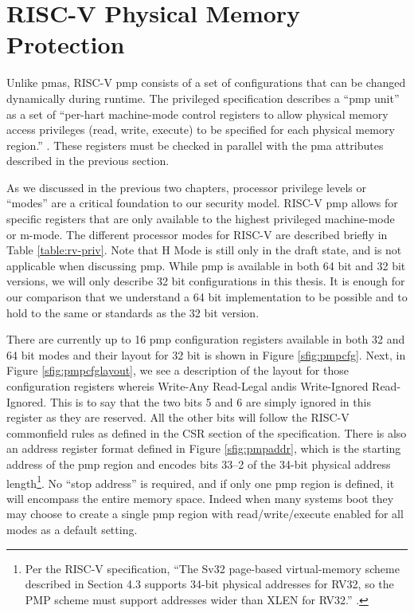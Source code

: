 \section{RISC-V Physical Memory Protection}
Unlike \glspl{pma}, RISC-V \gls{pmp} consists of a set of configurations that can be changed dynamically during runtime. The privileged specification describes a ``\gls{pmp} unit'' as a set of ``per-hart machine-mode control registers to allow physical memory access privileges (read, write, execute) to be specified for each physical memory region.'' \cite{PrivIsa2019}. These registers must be checked in parallel with the \gls{pma} attributes described in the previous section.

\renewcommand{\arraystretch}{2}


As we discussed in the previous two chapters, processor privilege levels or ``modes'' are a critical foundation to our security model. RISC-V \gls{pmp} allows for specific registers that are only available to the highest privileged machine-mode or m-mode. The different processor modes for RISC-V are described briefly in Table \ref{table:rv-priv}. Note that H Mode is still only in the draft state, and is not applicable when discussing \gls{pmp}. While \gls{pmp} is available in both 64 bit and 32 bit versions, we will only describe 32 bit configurations in this thesis. It is enough for our comparison that we understand a 64 bit implementation to be possible and to hold to the same or standards as the 32 bit version. 

\renewcommand{\arraystretch}{1}


There are currently up to 16 \gls{pmp} configuration registers available in both 32 and 64 bit modes and their layout for 32 bit is shown in Figure \ref{sfig:pmpcfg}. Next, in Figure \ref{sfig:pmpcfglayout}, we see a description of the layout for those configuration registers where\;\warl\;is Write-Any Read-Legal and\;\wiri\;is Write-Ignored Read-Ignored. This is to say that the two bits 5 and 6 are simply ignored in this register as they are reserved. All the other bits will follow the RISC-V common\;\warl\;field rules as defined in the CSR section of the specification. There is also an address register format defined in Figure \ref{sfig:pmpaddr}, which is the starting address of the \gls{pmp} region and encodes bits 33--2 of the 34-bit physical address length\footnote{Per the RISC-V specification, ``The Sv32 page-based virtual-memory scheme described in Section 4.3 supports 34-bit physical addresses for RV32, so the PMP scheme must support addresses wider than XLEN for RV32.'' \cite{PrivIsa2019}.}. No ``stop address'' is required, and if only one \gls{pmp} region is defined, it will encompass the entire memory space. Indeed when many systems boot they may choose to create a single \gls{pmp} region with read/write/execute enabled for all modes as a default setting.


